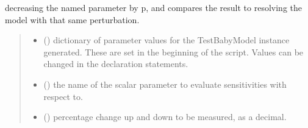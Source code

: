 \documentclass[letterpaper,10pt,english]{sphinxmanual}
\begin{document}
\begin{fulllineitems}
\label{\detokenize{src.sensitivity.speed_test:src.sensitivity.speed_test.speed_accuracy_test}}
\pysigstartsignatures
\pysiglinewithargsret
{}
{\sphinxparamcomma {}\sphinxparamcomma {}}
{}
\pysigstopsignatures\begin{description}
\sphinxAtStartPar
decreasing the named parameter by p, and compares the result to resolving the model with that same perturbation.

\end{description}
\begin{quote}\begin{description}
\sphinxAtStartPar
\begin{itemize}
\item {} 
\sphinxAtStartPar
{} () \textendash{} dictionary of parameter values for the TestBabyModel instance generated. These are set in the beginning of the script.
Values can be changed in the declaration statements.

\item {} 
\sphinxAtStartPar
{} () \textendash{} the name of the scalar parameter to evaluate sensitivities with respect to.

\item {} 
\sphinxAtStartPar
{} () \textendash{} percentage change up and down to be measured, as a decimal.

\end{itemize}


\end{description}\end{quote}

\end{fulllineitems}
\end{document}
